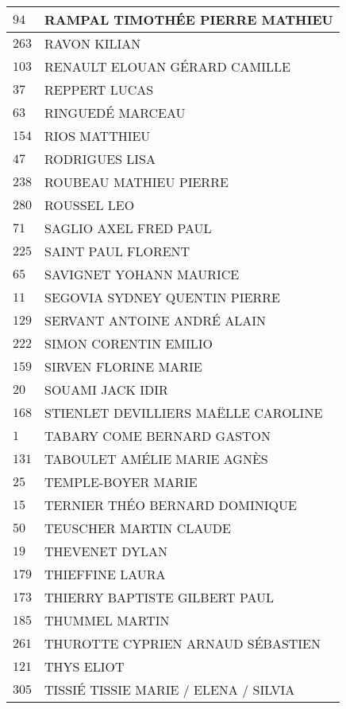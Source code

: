 \begin{xltabular}{\linewidth}{|l|X|}
    \hline
    $94$ & RAMPAL TIMOTHÉE PIERRE MATHIEU \\
    \hline
    $263$ & RAVON KILIAN \\
    \hline
    $103$ & RENAULT ELOUAN GÉRARD CAMILLE \\
    \hline
    $37$ & REPPERT LUCAS \\
    \hline
    $63$ & RINGUEDÉ MARCEAU \\
    \hline
    $154$ & RIOS MATTHIEU \\
    \hline
    $47$ & RODRIGUES LISA \\
    \hline
    $238$ & ROUBEAU MATHIEU PIERRE \\
    \hline
    $280$ & ROUSSEL LEO \\
    \hline
    $71$ & SAGLIO AXEL FRED PAUL \\
    \hline
    $225$ & SAINT PAUL FLORENT \\
    \hline
    $65$ & SAVIGNET YOHANN MAURICE \\
    \hline
    $11$ & SEGOVIA SYDNEY QUENTIN PIERRE \\
    \hline
    $129$ & SERVANT ANTOINE ANDRÉ ALAIN \\
    \hline
    $222$ & SIMON CORENTIN EMILIO \\
    \hline
    $159$ & SIRVEN FLORINE MARIE \\
    \hline
    $20$ & SOUAMI JACK IDIR \\
    \hline
    $168$ & STIENLET DEVILLIERS MAËLLE CAROLINE \\
    \hline
    $1$ & TABARY COME BERNARD GASTON \\
    \hline
    $131$ & TABOULET AMÉLIE MARIE AGNÈS \\
    \hline
    $25$ & TEMPLE-BOYER MARIE \\
    \hline
    $15$ & TERNIER THÉO BERNARD DOMINIQUE \\
    \hline
    $50$ & TEUSCHER MARTIN CLAUDE \\
    \hline
    $19$ & THEVENET DYLAN \\
    \hline
    $179$ & THIEFFINE LAURA \\
    \hline
    $173$ & THIERRY BAPTISTE GILBERT PAUL \\
    \hline
    $185$ & THUMMEL MARTIN \\
    \hline
    $261$ & THUROTTE CYPRIEN ARNAUD SÉBASTIEN \\
    \hline
    $121$ & THYS ELIOT \\
    \hline
    $305$ & TISSIÉ TISSIE MARIE / ELENA / SILVIA \\

\end{xltabular}
